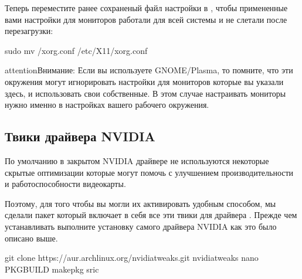 \documentclass[letterpaper,10pt,russian,openany]{sphinxmanual}
\begin{document}
\noindent{}

\sphinxAtStartPar
Теперь переместите ранее сохраненый файл настройки в , чтобы примененные вами настройки для мониторов
работали для всей системы и не слетали после перезагрузки:

\begin{sphinxVerbatim}[commandchars=\\\{\}]
sudo mv \PYGZti{}/xorg.conf /etc/X11/xorg.conf
\end{sphinxVerbatim}

\begin{sphinxadmonition}{attention}{Внимание:}
\sphinxAtStartPar
Если вы используете GNOME/Plasma, то помните, что эти окружения могут игнорировать настройки для мониторов которые вы указали здесь,
и использовать свои собственные. В этом случае настраивать мониторы нужно именно в настройках вашего рабочего окружения.
\end{sphinxadmonition}

\ignorespaces 

\subsection{Твики драйвера NVIDIA}
\label{\detokenize{source/first-steps:nvidia-tweaking}}\label{\detokenize{source/first-steps:index-12}}\label{\detokenize{source/first-steps:id11}}
\sphinxAtStartPar
По умолчанию в закрытом NVIDIA драйвере не используются некоторые скрытые оптимизации которые могут помочь с улучшением производительности и работоспособности видеокарты.

\sphinxAtStartPar
Поэтому, для того чтобы вы могли их активировать удобным способом, мы сделали пакет который включает в себя все эти твики для драйвера
\sphinxhyphen{} . Прежде чем устанавливать выполните установку самого драйвера NVIDIA как это было описано выше.

\sphinxAtStartPar
{}

\begin{sphinxVerbatim}[commandchars=\\\{\}]
git clone https://aur.archlinux.org/nvidia\PYGZhy{}tweaks.git
 nvidia\PYGZhy{}tweaks
nano PKGBUILD 
makepkg \PYGZhy{}sric
\end{sphinxVerbatim}
\end{document}

